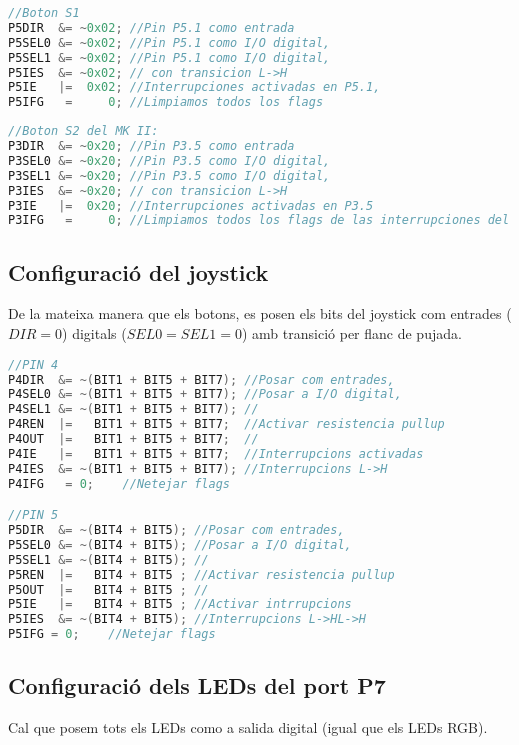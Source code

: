 \documentclass[12pt,a4paper]{article}
\begin{document}
\begin{lstlisting}[language=C++]
//Boton S1
P5DIR  &= ~0x02; //Pin P5.1 como entrada
P5SEL0 &= ~0x02; //Pin P5.1 como I/O digital,
P5SEL1 &= ~0x02; //Pin P5.1 como I/O digital,
P5IES  &= ~0x02; // con transicion L->H
P5IE   |=  0x02; //Interrupciones activadas en P5.1,
P5IFG   =     0; //Limpiamos todos los flags
\end{lstlisting}

\begin{lstlisting}[language=C++]
//Boton S2 del MK II:
P3DIR  &= ~0x20; //Pin P3.5 como entrada
P3SEL0 &= ~0x20; //Pin P3.5 como I/O digital,
P3SEL1 &= ~0x20; //Pin P3.5 como I/O digital,
P3IES  &= ~0x20; // con transicion L->H
P3IE   |=  0x20; //Interrupciones activadas en P3.5
P3IFG   =     0; //Limpiamos todos los flags de las interrupciones del puerto 3
\end{lstlisting}

\subsection{Configuració del joystick}

De la mateixa manera que els botons, es posen els bits del joystick com entrades ($DIR = 0$) digitals ($SEL0 = SEL1 = 0$) amb transició per flanc de pujada.
\begin{lstlisting}[language=C++]
//PIN 4
P4DIR  &= ~(BIT1 + BIT5 + BIT7); //Posar com entrades,
P4SEL0 &= ~(BIT1 + BIT5 + BIT7); //Posar a I/O digital,
P4SEL1 &= ~(BIT1 + BIT5 + BIT7); //
P4REN  |=   BIT1 + BIT5 + BIT7;  //Activar resistencia pullup
P4OUT  |=   BIT1 + BIT5 + BIT7;  //
P4IE   |=   BIT1 + BIT5 + BIT7;  //Interrupcions activadas
P4IES  &= ~(BIT1 + BIT5 + BIT7); //Interrupcions L->H
P4IFG   = 0;    //Netejar flags

//PIN 5
P5DIR  &= ~(BIT4 + BIT5); //Posar com entrades,
P5SEL0 &= ~(BIT4 + BIT5); //Posar a I/O digital,
P5SEL1 &= ~(BIT4 + BIT5); //
P5REN  |=   BIT4 + BIT5 ; //Activar resistencia pullup
P5OUT  |=   BIT4 + BIT5 ; //
P5IE   |=   BIT4 + BIT5 ; //Activar intrrupcions
P5IES  &= ~(BIT4 + BIT5); //Interrupcions L->HL->H
P5IFG = 0;    //Netejar flags
\end{lstlisting}

\subsection{Configuració dels LEDs del port P7}

Cal que posem tots els LEDs como a salida digital (igual que els LEDs RGB).
\end{document}
